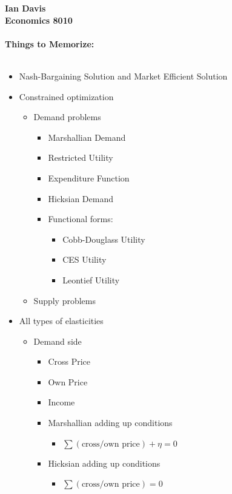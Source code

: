 
\let\counterwithout\relax
\let\counterwithin\relax
{}
\usepackage{listings}


\noindent \textbf{Ian Davis}\\
\noindent \textbf{Economics 8010}\\
\\
\noindent \textbf{Things to Memorize:}\\
\\
\begin{itemize}
	\item Nash-Bargaining Solution and Market Efficient Solution
	\item Constrained optimization
	\begin{itemize}
		\item Demand problems
		\begin{itemize}
			\item Marshallian Demand
			\item Restricted Utility
			\item Expenditure Function
			\item Hicksian Demand
			\item Functional forms:
			\begin{itemize}
				\item Cobb-Douglass Utility
				\item CES Utility
				\item Leontief Utility
			\end{itemize}
		\end{itemize}
		\item Supply problems
		\end{itemize}
	\item All types of elasticities
	\begin{itemize}
		\item Demand side
		\begin{itemize}
			\item Cross Price
			\item Own Price
			\item Income
			\item Marshallian adding up conditions
			\begin{itemize}
				\item $\sum (\text{cross/own price}) + \eta = 0$
			\end{itemize}
			\item Hicksian adding up conditions
			\begin{itemize}
				\item $\sum (\text{cross/own price}) = 0$

\end{itemize}
\end{itemize}
\end{itemize}
\end{itemize}
